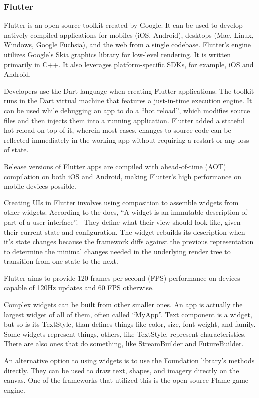 \subsubsection{Flutter}
Flutter is an open-source toolkit created by Google. It can be used to develop natively compiled applications for mobiles (iOS, Android), desktops (Mac, Linux, Windows, Google Fuchsia), and the web from a single codebase. Flutter's engine utilizes Google's Skia graphics library for low-level rendering. It is written primarily in C++. It also leverages platform-specific SDKs, for example, iOS and Android.

Developers use the Dart language when creating Flutter applications. The toolkit runs in the Dart virtual machine that features a just-in-time execution engine. It can be used while debugging an app to do a ``hot reload'', which modifies source files and then injects them into a running application. Flutter added a stateful hot reload on top of it, wherein most cases, changes to source code can be reflected immediately in the working app without requiring a restart or any loss of state.

Release versions of Flutter apps are compiled with ahead-of-time (AOT) compilation on both iOS and Android, making Flutter's high performance on mobile devices possible.~\cite{flutter-wiki}

Creating UIs in Flutter involves using composition to assemble widgets from other widgets. According to the docs, ``A widget is an immutable description of part of a user interface''.~\cite{flutter} They define what their view should look like, given their current state and configuration. The widget rebuilds its description when it's state changes because the framework diffs against the previous representation to determine the minimal changes needed in the underlying render tree to transition from one state to the next.

Flutter aims to provide 120 frames per second (FPS) performance on devices capable of 120Hz updates and 60 FPS otherwise.

Complex widgets can be built from other smaller ones. An app is actually the largest widget of all of them, often called ``MyApp''. Text component is a widget, but so is its TextStyle, than defines things like color, size, font-weight, and family. Some widgets represent things, others, like TextStyle, represent characteristics. There are also ones that do something, like StreamBuilder and FutureBuilder.

An alternative option to using widgets is to use the Foundation library's methods directly. They can be used to draw text, shapes, and imagery directly on the canvas. One of the frameworks that utilized this is the open-source Flame game engine.

